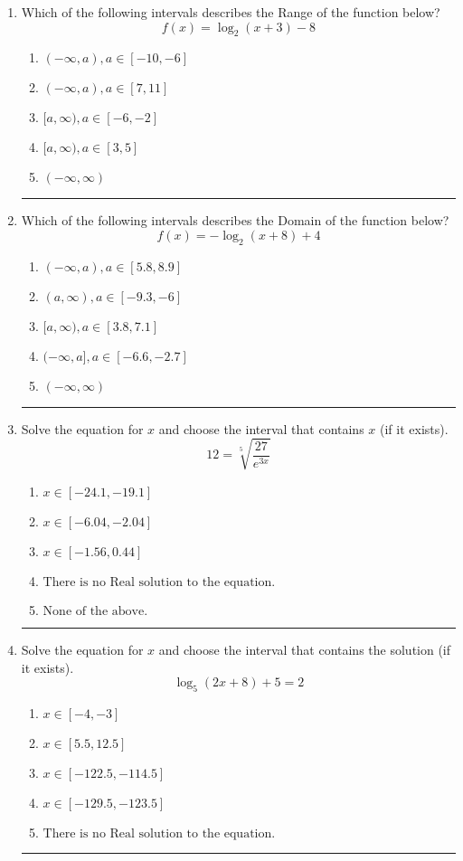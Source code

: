 \documentclass[14pt]{extbook}
\newcommand{\litem}[1]{\item#1\hspace*{-1cm}\rule{\textwidth}{0.4pt}}
\begin{document}
\begin{enumerate}
{\begin{enumerate}[label=\Alph*.]
\end{enumerate} }
\litem{
Which of the following intervals describes the Range of the function below?\[ f(x) = \log_2{(x+3)}-8 \]\begin{enumerate}[label=\Alph*.]
\item \( (-\infty, a), a \in [-10, -6] \)
\item \( (-\infty, a), a \in [7, 11] \)
\item \( [a, \infty), a \in [-6, -2] \)
\item \( [a, \infty), a \in [3, 5] \)
\item \( (-\infty, \infty) \)

\end{enumerate} }
\litem{
Which of the following intervals describes the Domain of the function below?\[ f(x) = -\log_2{(x+8)}+4 \]\begin{enumerate}[label=\Alph*.]
\item \( (-\infty, a), a \in [5.8, 8.9] \)
\item \( (a, \infty), a \in [-9.3, -6] \)
\item \( [a, \infty), a \in [3.8, 7.1] \)
\item \( (-\infty, a], a \in [-6.6, -2.7] \)
\item \( (-\infty, \infty) \)

\end{enumerate} }
\litem{
 Solve the equation for $x$ and choose the interval that contains $x$ (if it exists).\[  12 = \sqrt[5]{\frac{27}{e^{3x}}} \]\begin{enumerate}[label=\Alph*.]
\item \( x \in [-24.1, -19.1] \)
\item \( x \in [-6.04, -2.04] \)
\item \( x \in [-1.56, 0.44] \)
\item \( \text{There is no Real solution to the equation.} \)
\item \( \text{None of the above.} \)

\end{enumerate} }
\litem{
Solve the equation for $x$ and choose the interval that contains the solution (if it exists).\[ \log_{5}{(2x+8)}+5 = 2 \]\begin{enumerate}[label=\Alph*.]
\item \( x \in [-4, -3] \)
\item \( x \in [5.5, 12.5] \)
\item \( x \in [-122.5, -114.5] \)
\item \( x \in [-129.5, -123.5] \)
\item \( \text{There is no Real solution to the equation.} \)


\end{enumerate}}
\end{enumerate}
\end{document}
